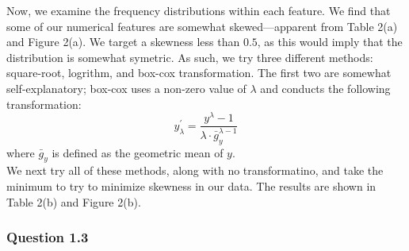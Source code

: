 \documentclass[11pt,letterpaper]{article}
\begin{document}
Now, we examine the frequency distributions within each feature. We find that 
some of our numerical features are somewhat skewed—apparent from Table 2(a) and
Figure 2(a). We target a skewness less than $0.5$, as this would imply that the 
distribution is somewhat symetric. As such, we try three different methods: 
square-root, logrithm, and box-cox transformation. The first two are somewhat
self-explanatory; box-cox uses a non-zero value of $\lambda$ and conducts the
following transformation:
\begin{equation}
y_{\lambda}^{'} = \dfrac{y^{\lambda}-1}{\lambda \cdot \bar{g}_y^{\lambda-1}}
\end{equation}
where $\bar{g}_y$ is defined as the geometric mean of $y$. \\
We next try all of these methods, along with no transformatino, and take the 
minimum to try to minimize skewness in our data. The results are shown in Table 
2(b) and Figure 2(b).


\subsubsection*{Question 1.3}
\end{document}
